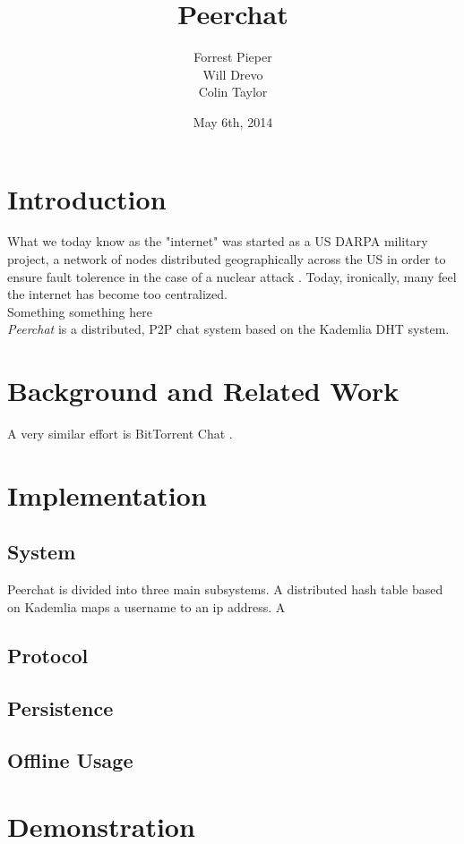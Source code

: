 \documentclass{article}
\title{Peerchat}
\author{
  Forrest Pieper\\
  Will Drevo\\
  Colin Taylor
}
\date{May 6th, 2014}
\begin{document}
\maketitle

\section{Introduction}
\label{introduction}

What we today know as the "internet" was started as a US DARPA military project, a network of nodes distributed geographically across the US in order to ensure fault tolerence in the case of a nuclear attack \cite{?}. Today, ironically, many feel the internet has become too centralized. \\

Something something here \\

\textit{Peerchat} is a distributed, P2P chat system based on the Kademlia DHT \cite{Maymounkov02} system. 

\section{Background and Related Work}

A very similar effort is BitTorrent Chat \cite{?}. 

\section{Implementation}

\subsection{System}
Peerchat is divided into three main subsystems. A distributed hash table based on Kademlia \cite{?} maps a username to an ip address. A 
\subsection{Protocol}
\subsection{Persistence}
\subsection{Offline Usage}

\section{Demonstration}
\end{document}
